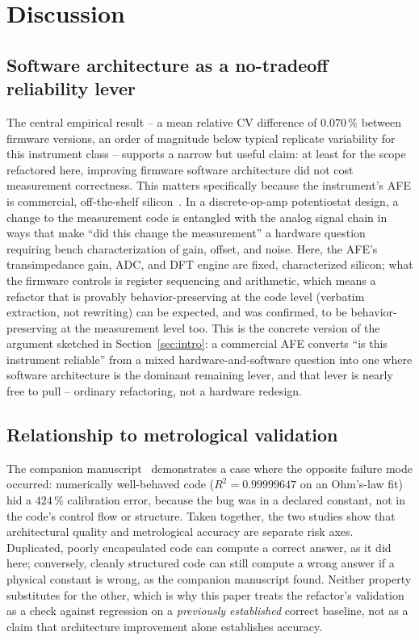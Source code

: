 \section{Discussion}
\label{sec:discussion}

\subsection{Software architecture as a no-tradeoff reliability lever}
The central empirical result -- a mean relative CV difference of
$0.070\,\%$ between firmware versions, an order of magnitude below typical
replicate variability for this instrument class -- supports a narrow but
useful claim: at least for the scope refactored here, improving firmware
software architecture did not cost measurement correctness. This matters
specifically because the instrument's AFE is commercial, off-the-shelf
silicon~\cite{devices2024ad5940}. In a discrete-op-amp potentiostat design,
a change to the measurement code is entangled with the analog signal chain
in ways that make ``did this change the measurement'' a hardware question
requiring bench characterization of gain, offset, and noise. Here, the AFE's
transimpedance gain, ADC, and DFT engine are fixed, characterized silicon;
what the firmware controls is register sequencing and arithmetic, which
means a refactor that is provably behavior-preserving at the code level
(verbatim extraction, not rewriting) can be expected, and was confirmed, to
be behavior-preserving at the measurement level too. This is the concrete
version of the argument sketched in Section~\ref{sec:intro}: a commercial
AFE converts ``is this instrument reliable'' from a mixed
hardware-and-software question into one where software architecture is the
dominant remaining lever, and that lever is nearly free to pull -- ordinary
refactoring, not a hardware redesign.

\subsection{Relationship to metrological validation}
The companion manuscript~\cite{clement2026linearity} demonstrates a case
where the opposite failure mode occurred: numerically well-behaved code
($R^2 = 0.99999647$ on an Ohm's-law fit) hid a $424\,\%$ calibration
error, because the bug was in a declared constant, not in the code's
control flow or structure. Taken together, the two studies show that
architectural quality and metrological accuracy are separate risk axes.
Duplicated, poorly encapsulated code can compute a correct answer, as it
did here; conversely, cleanly structured code can still compute a wrong
answer if a physical constant is wrong, as the companion manuscript found.
Neither property substitutes for the other, which is why this paper treats
the refactor's validation as a check against regression on a
\emph{previously established} correct baseline, not as a claim that
architecture improvement alone establishes accuracy.

